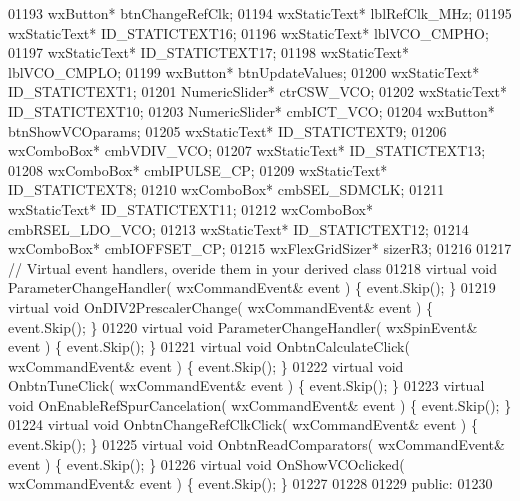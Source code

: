 \begin{DoxyCode}
01193         wxButton* btnChangeRefClk;
01194         wxStaticText* lblRefClk_MHz;
01195         wxStaticText* ID_STATICTEXT16;
01196         wxStaticText* lblVCO_CMPHO;
01197         wxStaticText* ID_STATICTEXT17;
01198         wxStaticText* lblVCO_CMPLO;
01199         wxButton* btnUpdateValues;
01200         wxStaticText* ID_STATICTEXT1;
01201         NumericSlider* ctrCSW_VCO;
01202         wxStaticText* ID_STATICTEXT10;
01203         NumericSlider* cmbICT_VCO;
01204         wxButton* btnShowVCOparams;
01205         wxStaticText* ID_STATICTEXT9;
01206         wxComboBox* cmbVDIV_VCO;
01207         wxStaticText* ID_STATICTEXT13;
01208         wxComboBox* cmbIPULSE_CP;
01209         wxStaticText* ID_STATICTEXT8;
01210         wxComboBox* cmbSEL_SDMCLK;
01211         wxStaticText* ID_STATICTEXT11;
01212         wxComboBox* cmbRSEL_LDO_VCO;
01213         wxStaticText* ID_STATICTEXT12;
01214         wxComboBox* cmbIOFFSET_CP;
01215         wxFlexGridSizer* sizerR3;
01216         
01217         \textcolor{comment}{// Virtual event handlers, overide them in your derived class}
01218         \textcolor{keyword}{virtual} \textcolor{keywordtype}{void} ParameterChangeHandler( wxCommandEvent& event ) \{ \textcolor{keyword}{event}.Skip(); \}
01219         \textcolor{keyword}{virtual} \textcolor{keywordtype}{void} OnDIV2PrescalerChange( wxCommandEvent& event ) \{ \textcolor{keyword}{event}.Skip(); \}
01220         \textcolor{keyword}{virtual} \textcolor{keywordtype}{void} ParameterChangeHandler( wxSpinEvent& event ) \{ \textcolor{keyword}{event}.Skip(); \}
01221         \textcolor{keyword}{virtual} \textcolor{keywordtype}{void} OnbtnCalculateClick( wxCommandEvent& event ) \{ \textcolor{keyword}{event}.Skip(); \}
01222         \textcolor{keyword}{virtual} \textcolor{keywordtype}{void} OnbtnTuneClick( wxCommandEvent& event ) \{ \textcolor{keyword}{event}.Skip(); \}
01223         \textcolor{keyword}{virtual} \textcolor{keywordtype}{void} OnEnableRefSpurCancelation( wxCommandEvent& event ) \{ \textcolor{keyword}{event}.Skip(); \}
01224         \textcolor{keyword}{virtual} \textcolor{keywordtype}{void} OnbtnChangeRefClkClick( wxCommandEvent& event ) \{ \textcolor{keyword}{event}.Skip(); \}
01225         \textcolor{keyword}{virtual} \textcolor{keywordtype}{void} OnbtnReadComparators( wxCommandEvent& event ) \{ \textcolor{keyword}{event}.Skip(); \}
01226         \textcolor{keyword}{virtual} \textcolor{keywordtype}{void} OnShowVCOclicked( wxCommandEvent& event ) \{ \textcolor{keyword}{event}.Skip(); \}
01227         
01228     
01229     \textcolor{keyword}{public}:
01230         

\end{DoxyCode}
